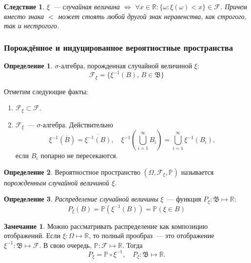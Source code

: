 \documentclass[oneside,final,14pt]{extreport}
\newcommand\myprob[1]{{\mathbb{P}(#1)}}
\theoremstyle{plain}
\newtheorem*{crlr}{Следствие}
\theoremstyle{definition}
\newtheorem*{defn}{Определение}
\newtheorem*{rmrk}{Замечание}
\theoremstyle{named}
\begin{document}
\begin{crlr}
    $\xi$~--- случайная величина $\Leftrightarrow$ $\forall x \in \mathbb{R} \colon \{\omega \colon \xi(\omega) < x \} \in \mathcal{F}$. Причем вместо знака $<$ может стоять любой другой знак неравенства, как строгого, так и нестрогого.
\end{crlr}

\subsubsection{Порождённое и индуцированное вероятностные пространства}
\begin{defn}
    $\sigma\text{-алгебра}$, порожденная случайной величиной $\xi$:
    \begin{equation*}
        \mathcal{F}_\xi = \{\xi^{-1}(B), \, B \in \mathfrak{B} \}
    \end{equation*}
\end{defn}

Отметим следующие факты:
\begin{enumerate}
    \item $\mathcal{F}_\xi \subset \mathcal{F}.$
    \item $\mathcal{F}_\xi$~--- ${\sigma \text{-алгебра}}$. Действительно
    \begin{equation*}
        \xi^{-1}(\overline{B}) = \overline{\xi^{-1}(B)}, \quad
        \xi^{-1}\left(\bigcup\limits_{i=1}^{\infty}B_i\right) = \bigcup\limits_{i=1}^\infty \xi^{-1}(B_i),
    \end{equation*}
   если $B_i$ попарно не пересекаются.
\end{enumerate}

\begin{defn}
    Вероятностное пространство $(\Omega,\mathcal{F}_\xi,\mathbb{P})$ называется {\it порожденным случайной величиной $\xi$}.
\end{defn}

\begin{defn}
    {\it Распределение случайной величины} $\xi$~--- функция ${P_\xi: \mathfrak{B} \mapsto \mathbb{R}}$:
    \begin{equation*}
        P_\xi(B) = \myprob{\xi^{-1}(B)} = \myprob{\xi \in B}
    \end{equation*}
\end{defn}

\begin{rmrk}
    Можно рассматривать распределение как композицию отображений. Если $\xi: \Omega \mapsto \mathbb{R}$, то полный прообраз~--- это отображение $\xi^{-1}: \mathfrak{B} \mapsto \mathcal{F}$. В свою очередь, $\mathbb{P}: \mathcal{F} \mapsto \mathbb{R}$. Тогда
    \begin{equation*}
        P_{\xi} = \mathbb{P} \circ \xi^{-1}, \quad P_{\xi}: \mathfrak{B} \mapsto \mathbb{R}.
    \end{equation*}
\end{rmrk}
\end{document}
